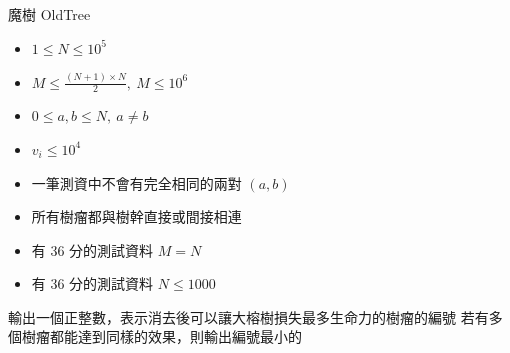 \begin{problem}{魔樹 OldTree}
\begin{iofmt}
\begin{itemize}
	\item $1 \leq N \leq 10^5$
	\item $M \leq \frac{{}(N+1) \times N}{2},\ M \leq 10^6$
	\item $0 \leq a, b \leq N,\ a\neq b$
	\item $v_i \leq 10^4$
	\item 一筆測資中不會有完全相同的兩對 $(a,b)$
	\item 所有樹瘤都與樹幹直接或間接相連
	\item 有 36 分的測試資料 $M = N$
	\item 有 36 分的測試資料 $N \leq 1000$
\end{itemize}
\end{iofmt}

\OutputFile

輸出一個正整數，表示消去後可以讓大榕樹損失最多生命力的樹瘤的編號 \newline
若有多個樹瘤都能達到同樣的效果，則輸出編號最小的 \newline

\Examples

\begin{example}
%
%
\end{example}


\end{problem}
